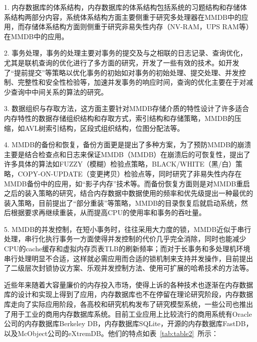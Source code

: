 \documentclass[literaturereview]{zjutreport}
\begin{document}
1. 内存数据库的体系结构，内存数据库的体系结构包括系统的习题结构和存储体系结构两部分内容，系统体系结构方面主要侧重于研究多处理器在MMDB中的应用，而存储体系结构方面则侧重于研究非易失性内存（NV-RAM，UPS RAM等）在MMDB中的应用。

2. 事务处理，事务的处理主要对事务的提交及与之相联的日志记录、查询优化，尤其是联机查询的优化进行了多方面的研究，开发了一些有效的技术。如开发了“提前提交”等策略以优化事务的初始如对事务的初始处理、提交处理、并发控制、完整性和安全性检验等，加速并发事务的响应时间，查询的优化主要在于对减少查询中中间关系的算法的研究。

3. 数据组织与存取方法，这方面主要针对MMDB存储介质的特性设计了许多适合内存特性的数据存储组织结构和存取方式，索引结构和存储策略，MMDB的压缩，如AVL树索引结构，区段式组织结构，位图分配法等。

4. MMDB的备份和恢复，备份方面更是提出了多种方案，为了预防MMDB的崩溃主要是结合检查点和日志来保证MMDB（MMDB）在崩溃后的可恢复性，提出了许多具体的算法如FUZZY（模糊）检验点策略，BLACK/WHITE（黑/白）策略，COPY-ON-UPDATE（变更拷贝）检验点等，同时研究了非易失性内存在MMDB备份中的应用，如“影子内存”技术等。而备份恢复方面则是对MMDB重启之后的装入策略的研究，结合内存数据中数据使用的频率和优先级提出一种最优的装入策略，目前提出了“部分重装”等策略，MMDB的目录恢复后就启动系统，然后根据要求再继续重装，从而提高CPU的使用率和事务的吞吐量。

5. MMDB的并发控制，在短小事务时，往往采用大力度的锁，MMDB近似于串行处理，串行化执行事务一方面使得并发控制的代价几乎完全消除，同时也能减少CPU的cache缓存和虚拟内存页表TLB的刷新频率；而对于长事务和多处理机环境串行处理明显不合适，这样就必需应用而合适的锁机制来支持并发操作，目前提出了二级层次封锁协议方案、乐观并发控制方法、使用可扩展的哈希技术的方法等。

近些年来随着大容量廉价的内存投入市场，使得上诉的各种技术也逐渐在内存数据库的设计和实现上得到了应用，内存数据库也不在停留在理论研究阶段，内存数据库走向了实际应用阶段，各高校和研究机构发布了研究模型系统，一些公司也推出了用于工业的商用内存数据库系统。目前工业应用上比较流行的商用系统有Oracle公司的内存数据库Berkeley DB，内存数据库SQLite，开源的内存数据库FastDB，以及McObject公司的eXtremDB。他们的特点如表~\ref{tab:table2}~所示：
\end{document}
